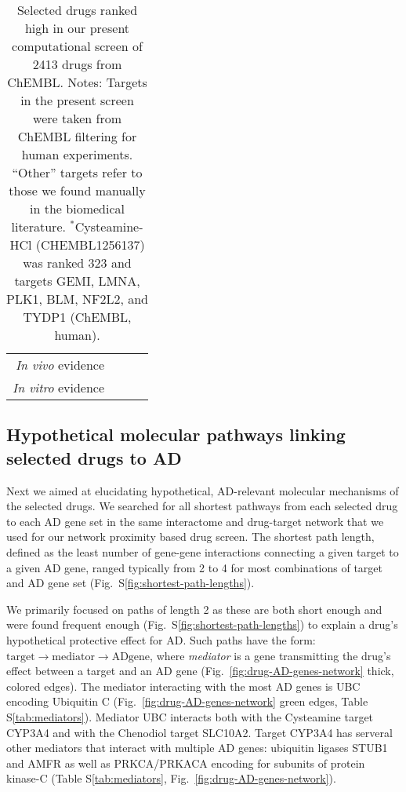 \documentclass[letterpaper]{article}
\begin{document}
\begin{table}
\begin{tabular}{r|c|c|c}
               \emph{In vivo} evidence & \cite{DeMiranda2013,DeMiranda2014} &       \cite{Keene2002} &                \cite{Cicchetti2019} \\
               \emph{In vitro} evidence &      \cite{Lee2019,Rzemieniec2019} &                        &          \cite{Besouw2013,Paul2019} \\
\bottomrule
\end{tabular}
\caption{
Selected drugs ranked high in our present computational screen of 2413 drugs
from ChEMBL.  Notes: Targets in the present screen were taken from ChEMBL filtering for human
experiments. ``Other'' targets refer to those we found manually in the
biomedical literature. $^\ast$Cysteamine-HCl (CHEMBL1256137) was ranked 323
and targets GEMI, LMNA, PLK1, BLM, NF2L2, and TYDP1 (ChEMBL, human).
}
\label{tab:selected-drugs}
\end{table}

\subsection{Hypothetical molecular pathways linking selected drugs to AD}

Next we aimed at elucidating hypothetical, AD-relevant molecular mechanisms of
the selected drugs.  We searched for all shortest pathways from each selected
drug to each AD gene set in the same interactome and drug-target network that
we used for our network proximity based drug screen.  The shortest path
length, defined as the least number of gene-gene interactions connecting a
given target to a given AD gene, ranged typically from 2 to 4 for most
combinations of target and AD gene set
(Fig.~S\ref{fig:shortest-path-lengths}).

We primarily focused on paths of length 2 as these are both short enough and
were found frequent enough (Fig.~S\ref{fig:shortest-path-lengths}) to explain
a drug's hypothetical protective effect for AD.  Such paths have the form:
$\mathrm{target} \rightarrow \mathrm{mediator} \rightarrow \mathrm{AD gene}$,
where \emph{mediator} is a gene transmitting the drug's effect between a target
and an AD gene (Fig.~\ref{fig:drug-AD-genes-network} thick, colored edges).
The mediator interacting with the most AD genes is UBC encoding Ubiquitin C
(Fig.~\ref{fig:drug-AD-genes-network} green edges, Table
S\ref{tab:mediators}). Mediator UBC interacts both with the Cysteamine target
CYP3A4 and with the Chenodiol target SLC10A2.  Target CYP3A4 has serveral
other mediators that interact with multiple AD genes: ubiquitin ligases STUB1
and AMFR as well as PRKCA/PRKACA encoding for subunits of protein kinase-C
(Table S\ref{tab:mediators}, Fig.~\ref{fig:drug-AD-genes-network}).
\end{document}
